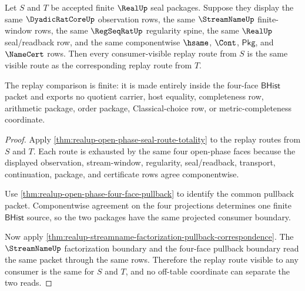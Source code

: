 \begin{theorem}
\label{thm:realup-four-face-consumer-replay}
Let $S$ and $T$ be accepted finite $\RealUp$ seal packages. Suppose they display
the same $\DyadicRatCoreUp$ observation rows, the same $\StreamNameUp$
finite-window rows, the same $\RegSeqRatUp$ regularity spine, the same $\RealUp$
seal/readback row, and the same componentwise $\hsame$, $\Cont$,
$\mathsf{Pkg}$, and $\NameCert$ rows. Then every consumer-visible replay route
from $S$ is the same visible route as the corresponding replay route from $T$.

The replay comparison is finite: it is made entirely inside the four-face
$\mathsf{BHist}$ packet and exports no quotient carrier, host equality,
completeness row, arithmetic package, order package, Classical-choice row, or
metric-completeness coordinate.
\end{theorem}
\begin{proof}
Apply \autoref{thm:realup-open-phase-seal-route-totality} to the replay routes
from $S$ and $T$. Each route is exhausted by the same four open-phase faces
because the displayed observation, stream-window, regularity, seal/readback,
transport, continuation, package, and certificate rows agree componentwise.

Use \autoref{thm:realup-open-phase-four-face-pullback} to identify the common
pullback packet. Componentwise agreement on the four projections determines one
finite $\mathsf{BHist}$ source, so the two packages have the same projected
consumer boundary.

Now apply
\autoref{thm:realup-streamname-factorization-pullback-correspondence}. The
$\StreamNameUp$ factorization boundary and the four-face pullback boundary read
the same packet through the same rows. Therefore the replay route visible to any
consumer is the same for $S$ and $T$, and no off-table coordinate can separate
the two reads.
\end{proof}

